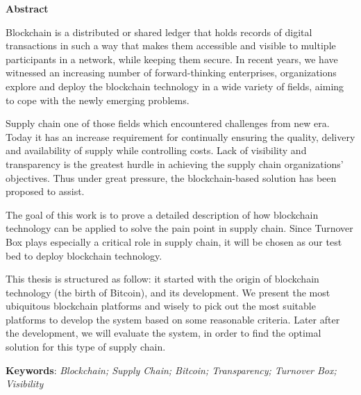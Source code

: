 \thispagestyle{plain}
\vspace*{\fill}
\begin{center}
	\Large
	\textbf{Abstract}
\end{center}

\vspace{1cm}
Blockchain is a distributed or shared ledger that holds records of digital transactions in such a way that makes them accessible and visible to multiple participants in a network, while keeping them secure. In recent years, we have witnessed an increasing number of forward-thinking enterprises, organizations explore and deploy the blockchain technology in a wide variety of fields, aiming to cope with the newly emerging problems. 

Supply chain one of those fields which encountered challenges from new era. Today it has an increase requirement for continually ensuring the quality, delivery and availability of supply while controlling costs. Lack of visibility and transparency is the greatest hurdle in achieving the supply chain organizations' objectives. Thus under great pressure, the blockchain-based solution has been proposed to assist.

The goal of this work is to prove a detailed description of how blockchain technology can be applied to solve the pain point in supply chain. 
Since Turnover Box plays especially a critical role in supply chain, it will be chosen as our test bed to deploy blockchain technology. 

This thesis is structured as follow: it started with the origin of blockchain technology (the birth of Bitcoin), and its development. We present the most ubiquitous blockchain platforms and wisely to pick out the most suitable platforms to develop the system based on some reasonable criteria. Later after the development, we will evaluate the system, in order to find the optimal solution for this type of supply chain.

    \textbf{Keywords}: \textit{Blockchain; Supply Chain; Bitcoin;  Transparency; Turnover Box; Visibility}
\vspace*{\fill}